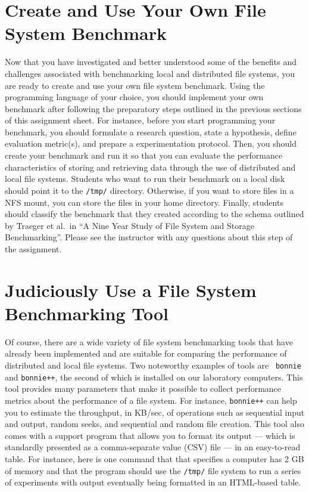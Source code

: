 \section*{Create and Use Your Own File System Benchmark}

Now that you have investigated and better understood some of the benefits and challenges associated with benchmarking
local and distributed file systems, you are ready to create and use your own file system benchmark. Using the
programming language of your choice, you should implement your own benchmark after following the preparatory steps
outlined in the previous sections of this assignment sheet. For instance, before you start programming your benchmark,
you should formulate a research question, state a hypothesis, define evaluation metric(s), and prepare a experimentation
protocol. Then, you should create your benchmark and run it so that you can evaluate the performance characteristics of
storing and retrieving data through the use of distributed and local file systems. Students who want to run their
benchmark on a local disk should point it to the {\tt /tmp/} directory. Otherwise, if you want to store files in a NFS
mount, you can store the files in your home directory. Finally, students should classify the benchmark that they created
according to the schema outlined by Traeger et al.\ in ``A Nine Year Study of File System and Storage Benchmarking''.
Please see the instructor with any questions about this step of the assignment.

\section*{Judiciously Use a File System Benchmarking Tool}

Of course, there are a wide variety of file system benchmarking tools that have already been implemented and are
suitable for comparing the performance of distributed and local file systems. Two noteworthy examples of tools are {\tt
bonnie} and {\tt bonnie++}, the second of which is installed on our laboratory computers. This tool provides many
parameters that make it possible to collect performance metrics about the performance of a file system. For instance,
{\tt bonnie++} can help you to estimate the throughput, in KB/sec, of operations such as sequential input and output,
random seeks, and sequential and random file creation. This tool also comes with a support program that allows you to
format its output --- which is standardly presented as a comma-separate value (CSV) file --- in an easy-to-read table.
For instance, here is one command that that specifies a computer has 2 GB of memory and that the program should use
the {\tt /tmp/} file system to run a series of experiments with output eventually being formatted in an HTML-based table.

